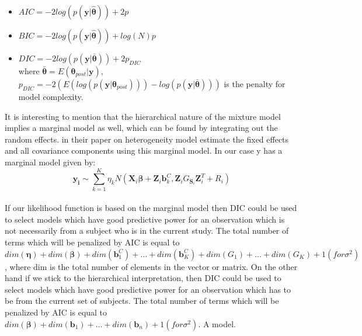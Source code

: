 \begin{itemize}
\item $AIC = -2log(p(\boldsymbol{y}|\boldsymbol{\hat{\theta}})) + 2p$
\item $BIC = -2log(p(\boldsymbol{y}|\boldsymbol{\hat{\theta}})) + log(N)p$
\item $DIC = -2log(p(\boldsymbol{y}|\boldsymbol{\bar{\theta}})) + 2p_{DIC}$\\
where $\boldsymbol{\bar{\theta}} = E(\boldsymbol{\theta}_{post}|\boldsymbol{y})$,\\
$p_{DIC} = -2(E(log(p(\boldsymbol{y}|\boldsymbol{\theta}_{post}))) - log(p(\boldsymbol{y}|\boldsymbol{\bar{\theta}})))$ is the penalty for model complexity.
\end{itemize}

It is interesting to mention that the hierarchical nature of the mixture model implies a marginal model as well, which can be found by integrating out the random effects. \citet{verbeke_linear_1996} in their paper on heterogeneity model estimate the fixed effects and all covariance components using this marginal model. In our case y has a marginal model given by:\\

$$\boldsymbol{y_i} \sim \sum_{k=1}^{K} \eta_k N(\boldsymbol{X}_{i}\boldsymbol{\beta} + \boldsymbol{Z}_{i}\boldsymbol{b}_k^C,\boldsymbol{Z}_{i}G_{\boldsymbol{S}_i}\boldsymbol{Z}_{i}^T + R_i)$$\\

If our likelihood function is based on the marginal model then DIC could be used to select models which have good predictive power for an observation which is not necessarily from a subject who is in the current study. The total number of terms which will be penalized by AIC is equal to $dim(\boldsymbol{\eta}) + dim(\boldsymbol{\beta}) + dim(\boldsymbol{b}_{1}^C) + \ldots + dim(\boldsymbol{b}_{K}^C) + dim(G_1) + \ldots + dim(G_K) + 1(for \sigma^2)$, where dim is the total number of elements in the vector or matrix. On the other hand if we stick to the hierarchical interpretation, then DIC could be used to select models which have good predictive power for an observation which has to be from the current set of subjects. The total number of terms which will be penalized by AIC is equal to $dim(\boldsymbol{\beta}) + dim(\boldsymbol{b}_1) + \ldots + dim(\boldsymbol{b}_n) + 1(for \sigma^2)$. A model.

